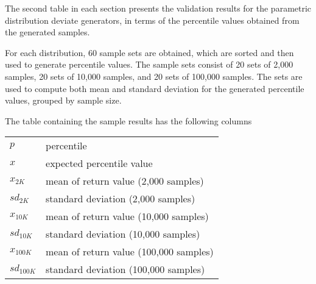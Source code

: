 The second table in each section presents the validation results for the 
parametric distribution deviate generators, in terms of the percentile 
values obtained from the generated samples.

For each distribution, 60 sample sets are obtained, which are sorted and then
used to generate percentile values. The sample sets consist of 20 sets of 2,000
samples, 20 sets of 10,000 samples, and 20 sets of 100,000 samples. The sets 
are used to compute both mean and standard deviation for the generated percentile
values, grouped by sample size.

The table containing the sample results has the following columns
\begin{center}\begin{tabular}{|l|l|}\hline
$p$ & percentile \\
$x$ & expected percentile value \\
$x_{2K}$ & mean of return value (2,000 samples) \\
$sd_{2K}$ & standard deviation (2,000 samples) \\
$x_{10K}$ & mean of return value (10,000 samples) \\
$sd_{10K}$ & standard deviation (10,000 samples) \\
$x_{100K}$ & mean of return value (100,000 samples) \\
$sd_{100K}$ & standard deviation (100,000 samples) \\ \hline
\end{tabular}\end{center}
